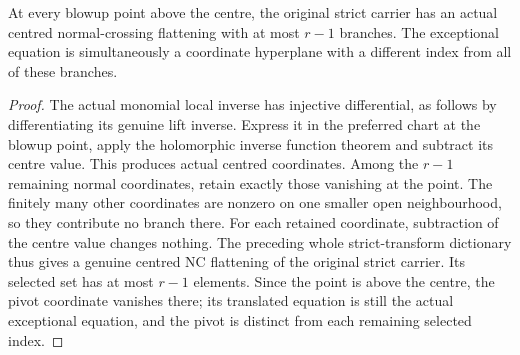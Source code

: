 \begin{lemma}
\label{hir:general-nc-highest-stratum-over-centre-count-decrease}
\leanok
At every blowup point above the centre, the original strict carrier
has an actual centred normal-crossing flattening with at most $r-1$
branches. The exceptional equation is simultaneously a coordinate
hyperplane with a different index from all of these branches.
\end{lemma}
\begin{proof}
The actual monomial local inverse has injective differential, as follows
by differentiating its genuine lift inverse. Express it in the preferred
chart at the blowup point, apply the holomorphic inverse function
theorem and subtract its centre value. This produces actual centred
coordinates. Among the $r-1$ remaining normal coordinates, retain
exactly those vanishing at the point. The finitely many other coordinates
are nonzero on one smaller open neighbourhood, so they contribute
no branch there. For each retained coordinate, subtraction of the
centre value changes nothing. The preceding whole strict-transform
dictionary thus gives a genuine centred NC flattening of the original
strict carrier. Its selected set has at most $r-1$ elements. Since
the point is above the centre, the pivot coordinate vanishes there;
its translated equation is still the actual exceptional equation,
and the pivot is distinct from each remaining selected index.
\end{proof}

